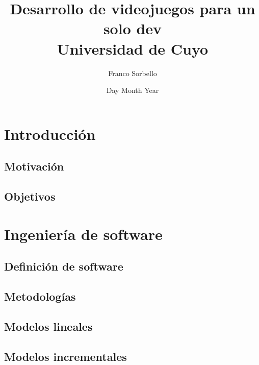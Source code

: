 \documentclass[12pt]{report}
\title{
    {Desarrollo de videojuegos para un solo dev}\\
    {\large Universidad de Cuyo}\\
}
\author{Franco Sorbello}
\date{Day Month Year}
\begin{document}
\maketitle
\tableofcontents
\chapter{Introducción}
\section{Motivación}

\section{Objetivos}


\chapter{Ingeniería de software}
\section{Definición de software}


\section{Metodologías}


\section{Modelos lineales}


\section{Modelos incrementales}


\printbibliography
\end{document}
